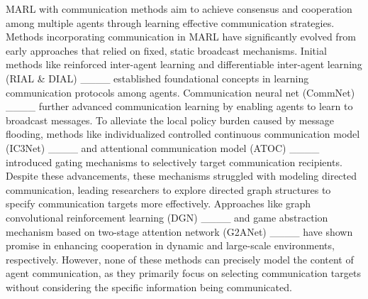 MARL with communication methods aim to achieve consensus and cooperation among multiple agents through learning effective communication strategies. Methods incorporating communication in MARL have significantly evolved from early approaches that relied on fixed, static broadcast mechanisms. Initial methods like reinforced inter-agent learning and differentiable inter-agent learning (RIAL \& DIAL) ____ established foundational concepts in learning communication protocols among agents. Communication neural net (CommNet) ____ further advanced communication learning by enabling agents to learn to broadcast messages. To alleviate the local policy burden caused by message flooding, methods like individualized controlled continuous communication model (IC3Net) ____ and attentional communication model (ATOC) ____ introduced gating mechanisms to selectively target communication recipients. Despite these advancements, these mechanisms struggled with modeling directed communication, leading researchers to explore directed graph structures to specify communication targets more effectively. Approaches like graph convolutional reinforcement learning (DGN) ____ and game abstraction mechanism based on two-stage attention network (G2ANet) ____ have shown promise in enhancing cooperation in dynamic and large-scale environments, respectively. However, none of these methods can precisely model the content of agent communication, as they primarily focus on selecting communication targets without considering the specific information being communicated. 

